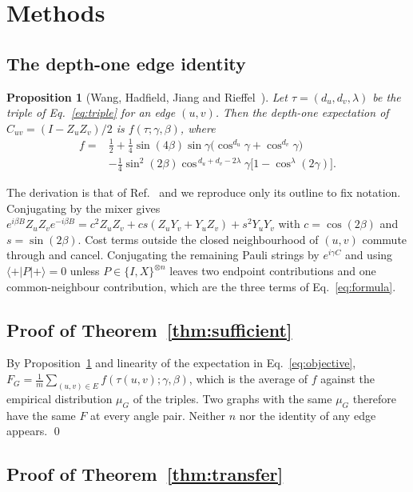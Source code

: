 \documentclass[10pt,letterpaper]{article}
\newtheorem{proposition}[theorem]{Proposition}
\theoremstyle{definition}
\begin{document}
\section{Methods}

\subsection{The depth-one edge identity}

\begin{proposition}[Wang, Hadfield, Jiang and Rieffel~\cite{wang2018fermionic}]
\label{prop:whjr}
Let $\tau=(d_u,d_v,\lambda)$ be the triple of Eq.~\eqref{eq:triple} for an edge
$(u,v)$. Then the depth-one expectation of $C_{uv}=(I-Z_uZ_v)/2$ is
$f(\tau;\gamma,\beta)$, where
\begin{align}
 f={}&\tfrac12+\tfrac14\sin(4\beta)\sin\gamma
 \bigl(\cos^{d_u}\!\gamma+\cos^{d_v}\!\gamma\bigr)\nonumber\\
 &-\tfrac14\sin^2(2\beta)\cos^{\,d_u+d_v-2\lambda}\!\gamma
 \bigl[1-\cos^{\lambda}(2\gamma)\bigr]. \label{eq:formula}
\end{align}
\end{proposition}

The derivation is that of Ref.~\cite{wang2018fermionic} and we reproduce only
its outline to fix notation. Conjugating by the mixer gives
$e^{i\beta B}Z_uZ_ve^{-i\beta B}=c^2Z_uZ_v+cs(Z_uY_v+Y_uZ_v)+s^2Y_uY_v$ with
$c=\cos(2\beta)$ and $s=\sin(2\beta)$. Cost terms outside the closed
neighbourhood of $(u,v)$ commute through and cancel. Conjugating the remaining
Pauli strings by $e^{i\gamma C}$ and using $\langle+|P|+\rangle=0$ unless
$P\in\{I,X\}^{\otimes n}$ leaves two endpoint contributions and one
common-neighbour contribution, which are the three terms of
Eq.~\eqref{eq:formula}.

\subsection{Proof of Theorem~\ref{thm:sufficient}}

By Proposition~\ref{prop:whjr} and linearity of the expectation in
Eq.~\eqref{eq:objective},
$F_G=\frac1m\sum_{(u,v)\in E}f(\tau(u,v);\gamma,\beta)$, which is the average of
$f$ against the empirical distribution $\mu_G$ of the triples. Two graphs with
the same $\mu_G$ therefore have the same $F$ at every angle pair. Neither $n$
nor the identity of any edge appears. \qed

\subsection{Proof of Theorem~\ref{thm:transfer}}
\end{document}
